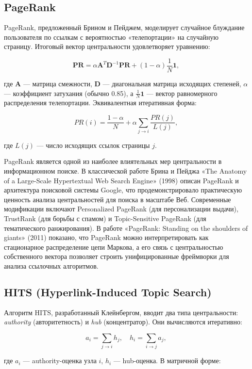 \documentclass[12pt, a4paper]{article}
\begin{document}
\subsection{PageRank}

PageRank, предложенный Брином и Пейджем, моделирует случайное блуждание пользователя по ссылкам с вероятностью «телепортации» на случайную страницу. Итоговый вектор центральности удовлетворяет уравнению:

\[
\mathbf{PR} = \alpha \mathbf{A}^T \mathbf{D}^{-1} \mathbf{PR} + (1-\alpha) \frac{1}{N} \mathbf{1},
\]

где $\mathbf{A}$ — матрица смежности, $\mathbf{D}$ — диагональная матрица исходящих степеней, $\alpha$ — коэффициент затухания (обычно 0.85), а $\frac{1}{N}\mathbf{1}$ — вектор равномерного распределения телепортации. Эквивалентная итеративная форма:

\[
PR(i) = \frac{1-\alpha}{N} + \alpha \sum_{j \to i} \frac{PR(j)}{L(j)},
\]

где $L(j)$ — число исходящих ссылок страницы $j$.

PageRank является одной из наиболее влиятельных мер центральности в информационном поиске. В классической работе Брина и Пейджа «The Anatomy of a Large-Scale Hypertextual Web Search Engine» (1998) описан PageRank и архитектура поисковой системы Google, что продемонстрировало практическую ценность анализа центральностей для поиска в масштабе Веб. Современные модификации включают Personalized PageRank (для персонализации выдачи), TrustRank (для борьбы с спамом) и Topic-Sensitive PageRank (для тематического ранжирования). В работе «PageRank: Standing on the shoulders of giants» (2011) показано, что PageRank можно интерпретировать как стационарное распределение цепи Маркова, а его связь с центральностью собственного вектора позволяет строить унифицированные фреймворки для анализа ссылочных алгоритмов.

\subsection{HITS (Hyperlink-Induced Topic Search)}

Алгоритм HITS, разработанный Клейнбергом, вводит два типа центральности: \textit{authority} (авторитетность) и \textit{hub} (концентратор). Они вычисляются итеративно:

\[
    a_i = \sum_{j \to i} h_j, \quad h_i = \sum_{i \to j} a_j,
    \]
    
    где $a_i$ — authority-оценка узла $i$, $h_i$ — hub-оценка. В матричной форме:
    
\end{document}

